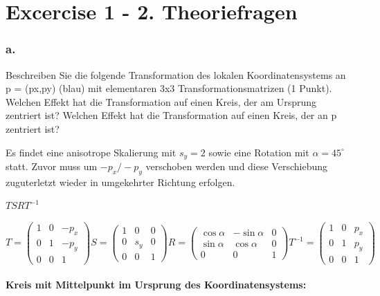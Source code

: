 \documentclass[12pt]{scrreprt}
\begin{document}


\chapter*{Excercise 1 - 2. Theoriefragen}

\subsection*{a.}
Beschreiben Sie die folgende Transformation des lokalen Koordinatensystems an p = (px,py) (blau) mit
elementaren 3x3 Transformationsmatrizen (1 Punkt). Welchen Effekt hat die Transformation auf einen
Kreis, der am Ursprung zentriert ist? Welchen Effekt hat die Transformation auf einen Kreis, der an p
zentriert ist?

Es findet eine anisotrope Skalierung mit $s_y = 2$ sowie eine Rotation mit $\alpha = 45^\circ$ statt.
Zuvor muss um $-p_x/-p_y$ verschoben werden und diese Verschiebung zuguterletzt wieder in umgekehrter Richtung erfolgen.

\begin{center}
\(
T S R T^{-1}
\)
\end{center}

\(
T = \left(
	\begin{array}{ccc}
		1 & 0 & -p_{x} \\
		0 & 1 & -p_{y} \\
		0 & 0 & 1
	\end{array}
\right)
S = \left(
	\begin{array}{ccc}
		1 & 0 & 0 \\
		0 & s_{y} & 0 \\
		0 & 0 & 1
	\end{array}
\right)
R = \left(
	\begin{array}{ccc}
		\cos\alpha & -\sin\alpha & 0 \\
		\sin\alpha & \cos\alpha & 0 \\
		0 & 0 & 1
	\end{array}
\right)
T^{-1} = \left(
	\begin{array}{ccc}
		1 & 0 & p_{x} \\
		0 & 1 & p_{y} \\
		0 & 0 & 1
	\end{array}
\right)
\)

\subsubsection*{Kreis mit Mittelpunkt im Ursprung des Koordinatensystems:}
\end{document}
